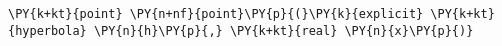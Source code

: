 \begin{Verbatim}[commandchars=\\\{\}]
    \PY{k+kt}{point} \PY{n+nf}{point}\PY{p}{(}\PY{k}{explicit} \PY{k+kt}{hyperbola} \PY{n}{h}\PY{p}{,} \PY{k+kt}{real} \PY{n}{x}\PY{p}{)}
\end{Verbatim}
